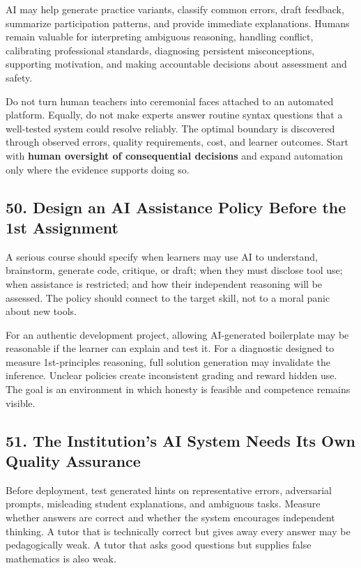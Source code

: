 AI may help generate practice variants, classify common errors, draft feedback, summarize participation patterns, and provide immediate explanations. Humans remain valuable for interpreting ambiguous reasoning, handling conflict, calibrating professional standards, diagnosing persistent misconceptions, supporting motivation, and making accountable decisions about assessment and safety.

Do not turn human teachers into ceremonial faces attached to an automated platform. Equally, do not make experts answer routine syntax questions that a well-tested system could resolve reliably. The optimal boundary is discovered through observed errors, quality requirements, cost, and learner outcomes. Start with \textbf{human oversight of consequential decisions} and expand automation only where the evidence supports doing so.

\subsection*{50. Design an AI Assistance Policy Before the 1st Assignment}

A serious course should specify when learners may use AI to understand, brainstorm, generate code, critique, or draft; when they must disclose tool use; when assistance is restricted; and how their independent reasoning will be assessed. The policy should connect to the target skill, not to a moral panic about new tools.

For an authentic development project, allowing AI-generated boilerplate may be reasonable if the learner can explain and test it. For a diagnostic designed to measure 1st-principles reasoning, full solution generation may invalidate the inference. Unclear policies create inconsistent grading and reward hidden use. The goal is an environment in which honesty is feasible and competence remains visible.

\subsection*{51. The Institution's AI System Needs Its Own Quality Assurance}

Before deployment, test generated hints on representative errors, adversarial prompts, misleading student explanations, and ambiguous tasks. Measure whether answers are correct and whether the system encourages independent thinking. A tutor that is technically correct but gives away every answer may be pedagogically weak. A tutor that asks good questions but supplies false mathematics is also weak.

